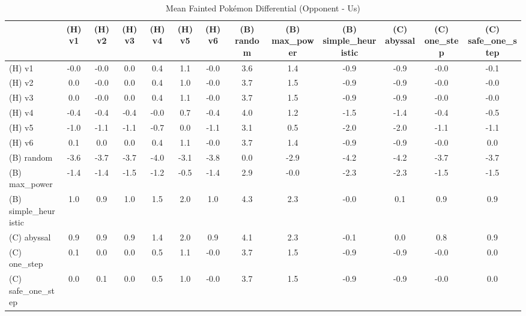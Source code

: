 \begin{table}[htbp]
\caption{Mean Fainted Pokémon Differential (Opponent - Us)}
\label{tab:fainted_diff}
\begin{tabular}{lcccccccccccc}
\hline
 & (H) v1 & (H) v2 & (H) v3 & (H) v4 & (H) v5 & (H) v6 & (B) random & (B) max\_power & (B) simple\_heuristic & (C) abyssal & (C) one\_step & (C) safe\_one\_step \\
\hline
(H) v1 & -0.0 & -0.0 & 0.0 & 0.4 & 1.1 & -0.0 & 3.6 & 1.4 & -0.9 & -0.9 & -0.0 & -0.1 \\
(H) v2 & 0.0 & -0.0 & 0.0 & 0.4 & 1.0 & -0.0 & 3.7 & 1.5 & -0.9 & -0.9 & -0.0 & -0.0 \\
(H) v3 & 0.0 & -0.0 & 0.0 & 0.4 & 1.1 & -0.0 & 3.7 & 1.5 & -0.9 & -0.9 & -0.0 & -0.0 \\
(H) v4 & -0.4 & -0.4 & -0.4 & -0.0 & 0.7 & -0.4 & 4.0 & 1.2 & -1.5 & -1.4 & -0.4 & -0.5 \\
(H) v5 & -1.0 & -1.1 & -1.1 & -0.7 & 0.0 & -1.1 & 3.1 & 0.5 & -2.0 & -2.0 & -1.1 & -1.1 \\
(H) v6 & 0.1 & 0.0 & 0.0 & 0.4 & 1.1 & -0.0 & 3.7 & 1.4 & -0.9 & -0.9 & -0.0 & 0.0 \\
(B) random & -3.6 & -3.7 & -3.7 & -4.0 & -3.1 & -3.8 & 0.0 & -2.9 & -4.2 & -4.2 & -3.7 & -3.7 \\
(B) max\_power & -1.4 & -1.4 & -1.5 & -1.2 & -0.5 & -1.4 & 2.9 & -0.0 & -2.3 & -2.3 & -1.5 & -1.5 \\
(B) simple\_heuristic & 1.0 & 0.9 & 1.0 & 1.5 & 2.0 & 1.0 & 4.3 & 2.3 & -0.0 & 0.1 & 0.9 & 0.9 \\
(C) abyssal & 0.9 & 0.9 & 0.9 & 1.4 & 2.0 & 0.9 & 4.1 & 2.3 & -0.1 & 0.0 & 0.8 & 0.9 \\
(C) one\_step & 0.1 & 0.0 & 0.0 & 0.5 & 1.1 & -0.0 & 3.7 & 1.5 & -0.9 & -0.9 & -0.0 & 0.0 \\
(C) safe\_one\_step & 0.0 & 0.1 & 0.0 & 0.5 & 1.0 & -0.0 & 3.7 & 1.5 & -0.9 & -0.9 & -0.0 & 0.0 \\
\hline
\end{tabular}
\end{table}

